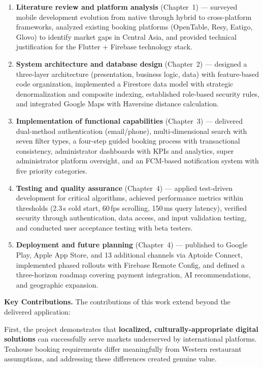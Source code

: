 \begin{enumerate}
  \item \textbf{Literature review and platform analysis} (Chapter~1) --- surveyed mobile development evolution from native through hybrid to cross-platform frameworks, analyzed existing booking platforms (OpenTable, Resy, Eatigo, Glovo) to identify market gaps in Central Asia, and provided technical justification for the Flutter + Firebase technology stack.

  \item \textbf{System architecture and database design} (Chapter~2) --- designed a three-layer architecture (presentation, business logic, data) with feature-based code organization, implemented a Firestore data model with strategic denormalization and composite indexing, established role-based security rules, and integrated Google Maps with Haversine distance calculation.

  \item \textbf{Implementation of functional capabilities} (Chapter~3) --- delivered dual-method authentication (email/phone), multi-dimensional search with seven filter types, a four-step guided booking process with transactional consistency, administrator dashboards with KPIs and analytics, super administrator platform oversight, and an FCM-based notification system with five priority categories.

  \item \textbf{Testing and quality assurance} (Chapter~4) --- applied test-driven development for critical algorithms, achieved performance metrics within thresholds (2.3\,s cold start, 60\,fps scrolling, 150\,ms query latency), verified security through authentication, data access, and input validation testing, and conducted user acceptance testing with beta testers.

  \item \textbf{Deployment and future planning} (Chapter~4) --- published to Google Play, Apple App Store, and 13 additional channels via Aptoide Connect, implemented phased rollouts with Firebase Remote Config, and defined a three-horizon roadmap covering payment integration, AI recommendations, and geographic expansion.
\end{enumerate}

\vspace{4mm}
\textbf{Key Contributions.}
The contributions of this work extend beyond the delivered application:

First, the project demonstrates that \textbf{localized, culturally-appropriate digital solutions} can successfully serve markets underserved by international platforms.
Teahouse booking requirements differ meaningfully from Western restaurant assumptions, and addressing these differences created genuine value.

